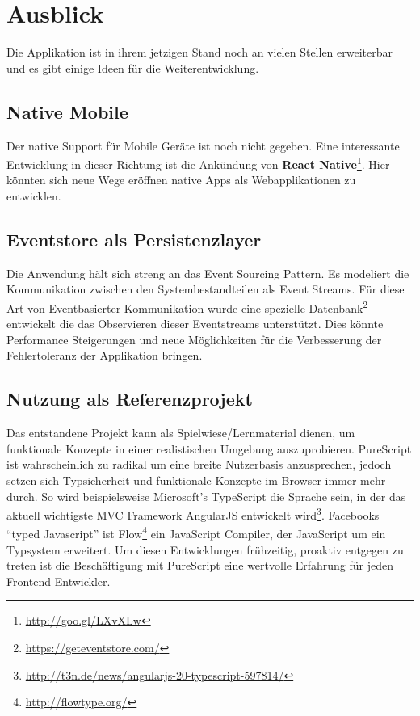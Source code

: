 \section{Ausblick}
Die Applikation ist in ihrem jetzigen Stand noch an vielen Stellen
erweiterbar und es gibt einige Ideen für die Weiterentwicklung.

\subsection{Native Mobile}
Der native Support für Mobile Geräte ist noch nicht gegeben. Eine
interessante Entwicklung in dieser Richtung ist die Ankündung von
\textbf{React Native}\footnote{\url{http://goo.gl/LXvXLw}}.
Hier könnten sich neue Wege eröffnen native Apps als Webapplikationen
zu entwicklen.

\subsection{Eventstore als Persistenzlayer}
Die Anwendung hält sich streng an das \gls{Event Sourcing} Pattern. Es
modeliert die Kommunikation zwischen den Systembestandteilen als Event
Streams. Für diese Art von Eventbasierter Kommunikation wurde eine spezielle
Datenbank\footnote{\url{https://geteventstore.com/}} entwickelt die
das Observieren dieser Eventstreams unterstützt. Dies könnte
Performance Steigerungen und neue Möglichkeiten für die Verbesserung
der Fehlertoleranz der Applikation bringen.

\subsection{Nutzung als Referenzprojekt}
Das entstandene Projekt kann als Spielwiese/Lernmaterial dienen, um
funktionale Konzepte in einer realistischen Umgebung auszuprobieren.
PureScript ist wahrscheinlich zu radikal um eine breite Nutzerbasis
anzusprechen, jedoch setzen sich Typsicherheit und funktionale
Konzepte im Browser immer mehr durch. So wird beispielsweise Microsoft's
TypeScript die Sprache sein, in der das aktuell wichtigste MVC
Framework AngularJS entwickelt wird\footnote{\url{http://t3n.de/news/angularjs-20-typescript-597814/}}.
Facebooks ``typed Javascript'' ist Flow\footnote{\url{http://flowtype.org/}} ein JavaScript
Compiler, der JavaScript um ein Typsystem erweitert. Um diesen
Entwicklungen frühzeitig, proaktiv entgegen zu treten ist die
Beschäftigung mit PureScript eine wertvolle Erfahrung für jeden
Frontend-Entwickler.

